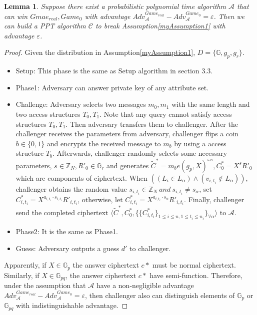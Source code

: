 \documentclass[smallextended]{svjour3}       %
\begin{document}
\newtheorem{myLemma}{Lemma}
\begin{myLemma}
	Suppose there exist a probabilistic polynomial time algorithm $\mathcal{A}$ that can win $Gmae_{real},Game_0$ with advantage $Adv^{Game_{real}}_{\mathcal{A}}-Adv^{Game_0}_{\mathcal{A}}=\varepsilon$. Then we can build a PPT algorithm $\mathcal{C}$ to break Assumption\ref{myAssumption1} with advantage $\varepsilon$.
\end{myLemma}
\begin{proof}
	Given the distribution in Assumption\ref{myAssumption1}, $D=\{\mathbb{G},g_p,g_r\}$.
	\begin{itemize}
		\item Setup: This phase is the same as Setup algorithm in section 3.3.
		\item Phase1: Adversary can answer private key of any attribute set.
		\item Challenge: Adversary selects two messages $m_0,m_1$ with the same length and two access structures $T_0,T_1$. Note that any query cannot satisfy access structures $T_0,T_1$.	Then adversary transfers them to challenger. After the challenger receives the parameters from adversary, challenger flips a coin $b\in\{0,1\}$ and encrypts the received message to $m_b$ by using a access structure $T_b$. Afterwards, challenger randomly selects some necessary parameters, $s\in \mathbb{Z}_N, R'_0 \in \mathbb{G}_r$ and generates $\tilde{C}^*=m_be(g_p,X)^{\omega s}, C_0^*=X^sR'_0$ which are components of ciphertext. When $((L_i \in L_\alpha)\wedge(v_{i,t_i} \notin L_\alpha))$, challenger obtains the random value $s_{i,t_i} \in \mathbb{Z}_N \  and \  s_{i,t_i} \neq s_\alpha$, set $C^*_{i,t_i}=X^{a_{i,t_i}\cdot s_{i,t_i}}R'_{i,t_i}$, otherwise, let $C^*_{i,t_i}=X^{a_{i,t_i}\cdot s_{\alpha}}R'_{i,t_i}$. Finally, challenger send the completed ciphertext $\langle \tilde{C}^*, C_0^*, \{\{C^*_{i,t_i}\}_{1 \leq i \leq n, 1 \leq t_i \leq n_i}\}_{\forall \alpha}\rangle$ to $\mathcal{A}$.
		\item Phase2: It is the same as Phase1.
		\item Guess: Adversary outputs a guess $d'$ to challenger.
	\end{itemize}
	Apparently, if $X \in \mathbb{G}_p$ the answer ciphertext $c*$ must be normal ciphertext. Similarly, if $X \in \mathbb{G}_{pq}$, the answer ciphertext $c*$ have semi-function. Therefore, under the assumption that $\mathcal{A}$ have a non-negligible advantage $Adv_{\mathcal{A}}^{Game_{real}}-Adv_{\mathcal{A}}^{Game_0}=\varepsilon$, then challenger also can distinguish elements of $\mathbb{G}_p$ or $\mathbb{G}_{pq}$ with indistinguishable advantage.
\end{proof}
\end{document}
